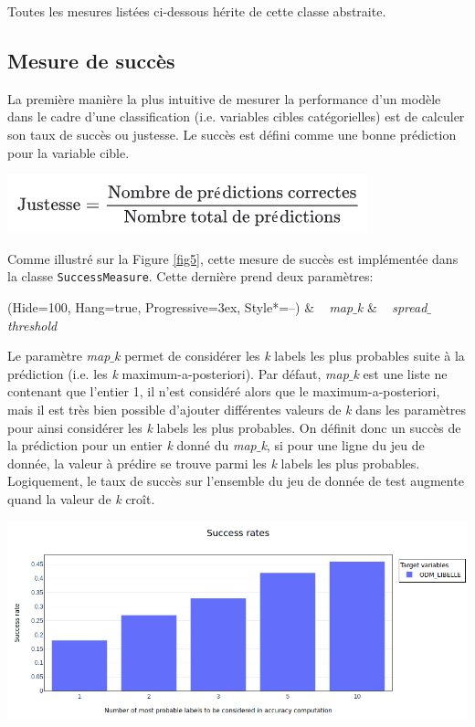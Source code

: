 Toutes les mesures listées ci-dessous hérite de cette classe abstraite.  

\subsection{Mesure de succès}

La première manière la plus intuitive de mesurer la performance d’un modèle dans le cadre d’une classification (i.e. variables cibles catégorielles) est de calculer son taux de succès ou justesse. Le succès est défini comme une bonne prédiction pour la variable cible.

\begin{center}
\includegraphics[scale=0.6]{figures/justesse.png}
\end{center}

Comme illustré sur la Figure \ref{fig5}, cette mesure de succès est implémentée  dans la classe \texttt{SuccessMeasure}. Cette dernière prend deux paramètres:
\begin{easylist}
\ListProperties(Hide=100, Hang=true, Progressive=3ex, Style*=--)
& ~ \textit{map$\_$k}
& ~ \textit{spread$\_$threshold}
\end{easylist}

Le paramètre \textit{map$\_$k} permet de considérer les \textit{k} labels les plus probables suite à la prédiction (i.e. les \textit{k} maximum-a-posteriori). Par défaut, \textit{map$\_$k} est une liste ne contenant que l’entier 1, il n’est considéré alors que le maximum-a-posteriori, mais il est très bien possible d'ajouter différentes valeurs de \textit{k} dans les paramètres pour ainsi considérer les \textit{k} labels les plus probables. On définit donc un succès de la prédiction pour un entier \textit{k} donné du \textit{map$\_$k}, si pour une ligne du jeu de donnée, la valeur à prédire se trouve parmi les \textit{k} labels les plus probables. Logiquement, le taux de succès sur l’ensemble du jeu de donnée de test augmente quand la valeur de \textit{k} croît.

\begin{center}
\includegraphics[scale=0.4]{figures/rapport_success_rate.png}
\label{fig10}
\end{center}

